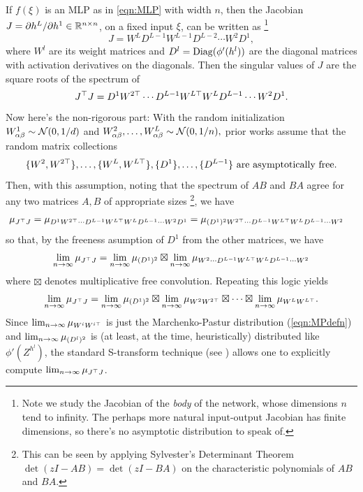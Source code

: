 \documentclass[main.tex]{subfiles}
\begin{document}
If $f(\xi)$ is an MLP as in \cref{eqn:MLP} with width $n$, then the Jacobian $J=\partial h^L/\partial {h^1} \in \mathbb{R}^{n\times n}$, on a fixed input $\xi$, can be written as%
\footnote{
    Note we study the Jacobian of the \emph{body} of the network, whose dimensions $n$ tend to infinity.
    The perhaps more natural input-output Jacobian has finite dimensions, so there's no asymptotic distribution to speak of.
}
\[
J=W^{L}D^{L-1}W^{L-1}D^{L-2}\cdots W^{2}D^{1},
\]
where $W^{l}$ are its weight matrices and $D^{l}=\mathrm{Diag}(\phi'(h^{l}))$ are the diagonal matrices with activation derivatives on the diagonals. Then the singular values of $J$ are the square roots of the spectrum of 
\[
J^{\top}J=D^{1}W^{2\top}\cdots D^{L-1}W^{L\top}W^{L}D^{L-1}\cdots W^{2}D^{1}.
\]
Now here's the non-rigorous part: 
With the random initialization $W_{\alpha\beta}^1\sim\mathcal{N}(0,1/d)$ and $W_{\alpha\beta}^2, \ldots, W_{\alpha\beta}^L \sim\mathcal{N}(0,1/n),$
prior works assume that the random matrix collections 
\begin{equation}
\text{$\{\ensuremath{W^{2}},\ensuremath{W^{2\trsp}}\},\ensuremath{\ldots},\{\ensuremath{W^{L}},\ensuremath{W^{L\trsp}}\},\{\ensuremath{D^{1}}\},\ensuremath{\ldots},\{\ensuremath{D^{L-1}}\}$ are asymptotically free.}\label{stmt:AsymptoticFreenessAssumption}
\end{equation}
Then, with this assumption, noting that the spectrum of $AB$ and $BA$ agree for any two matrices $A,B$ of appropriate sizes%
\footnote{This can be seen by applying Sylvester's Determinant Theorem $\det(zI-AB)=\det(zI-BA)$ on the characteristic polynomials of $AB$ and $BA$.}, we have
\begin{align*}
\mu_{J^{\top}J} & =\mu_{D^{1}W^{2\top}\cdots D^{L-1}W^{L\top}W^{L}D^{L-1}\cdots W^{2}D^{1}}
  =\mu_{(D^{1})^{2}W^{2\top}\cdots D^{L-1}W^{L\top}W^{L}D^{L-1}\cdots W^{2}}
\end{align*}
so that, by the freeness asumption of $D^{1}$ from the other matrices, we have
\[
\lim_{n\to\infty}\mu_{J^{\top}J}=\lim_{n\to\infty}\mu_{(D^{1})^{2}}\boxtimes\lim_{n\to\infty}\mu_{W^{2}\cdots D^{L-1}W^{L\top}W^{L}D^{L-1}\cdots W^{2}}
\]
where $\boxtimes$ denotes multiplicative free convolution. Repeating this logic yields
\[
\lim_{n\to\infty}\mu_{J^{\top}J}=\lim_{n\to\infty}\mu_{(D^{1})^{2}}\boxtimes\lim_{n\to\infty}\mu_{W^{2}W^{2\top}}\boxtimes\cdots\boxtimes\lim_{n\to\infty}\mu_{W^{L}W^{L\top}}.
\]
Since $\lim_{n\to\infty}\mu_{W^{i}W^{i\top}}$ is just the Marchenko-Pastur distribution (\cref{eqn:MPdefn}) and $\lim_{n\to\infty}\mu_{(D^{l})^{2}}$ is (at least, at the time, heuristically) distributed like $\phi'(Z^{h^{l}})$, the standard S-transform technique (see \citet{speicher_free_2009}) allows one to explicitly compute $\lim_{n\to\infty}\mu_{J^{\top}J}$.
\end{document}
